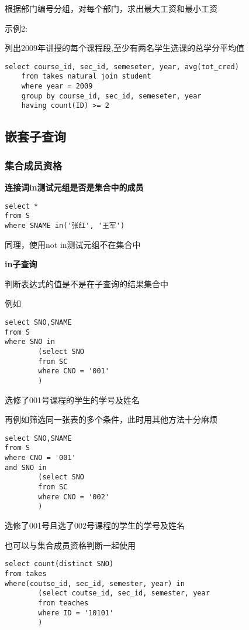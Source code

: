 \documentclass{article}        %
\begin{document}
根据部门编号分组，对每个部门，求出最大工资和最小工资

示例2:

列出2009年讲授的每个课程段,至少有两名学生选课的总学分平均值

\begin{verbatim}
select course_id, sec_id, semeseter, year, avg(tot_cred)
    from takes natural join student
    where year = 2009
    group by course_id, sec_id, semeseter, year
    having count(ID) >= 2
\end{verbatim}

\subsection{嵌套子查询}

\subsubsection{集合成员资格}

\textbf{连接词in测试元组是否是集合中的成员}

\begin{verbatim}
select *
from S 
where SNAME in('张红', '王军')
\end{verbatim}

同理，使用not in测试元组不在集合中

\textbf{in子查询}

判断表达式的值是不是在子查询的结果集合中

例如

\begin{verbatim}
select SNO,SNAME
from S
where SNO in 
        (select SNO
        from SC 
        where CNO = '001'
        )
\end{verbatim}
选修了001号课程的学生的学号及姓名

再例如筛选同一张表的多个条件，此时用其他方法十分麻烦

\begin{verbatim}
select SNO,SNAME
from S
where CNO = '001'
and SNO in 
        (select SNO
        from SC 
        where CNO = '002'
        )
\end{verbatim}
选修了001号且选了002号课程的学生的学号及姓名

也可以与集合成员资格判断一起使用

\begin{verbatim}
select count(distinct SNO)
from takes
where(coutse_id, sec_id, semester, year) in
        (select coutse_id, sec_id, semester, year
        from teaches
        where ID = '10101'
        )
\end{verbatim}
\end{document}
